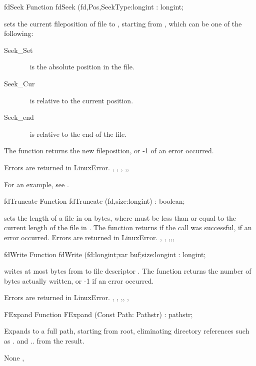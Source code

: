 \begin{function}{fdSeek}
\Declaration
Function fdSeek (fd,Pos,SeekType:longint : longint;

\Description
{} sets the current fileposition of file  to
, starting from , which can be one of the following:
\begin{description}
\item [Seek\_Set] \  is the absolute position in the file.
\item [Seek\_Cur] \  is relative to the current position.
\item [Seek\_end] \  is relative to the end of the file.
\end{description}
The function returns the new fileposition, or -1 of an error occurred.

\Errors
Errors are returned in LinuxError.
\SeeAlso
{}, , ,
,,
\end{function}
For an example, see .
\begin{function}{fdTruncate}
\Declaration
Function fdTruncate (fd,size:longint) : boolean;

\Description
{} sets the length of a file in  on 
bytes, where  must be less than or equal to the current length of
the file in .
The function returns  if the call was successful,  if
an error occurred.
\Errors
Errors are returned in LinuxError.
\SeeAlso
{}, , ,,,
\end{function}
\begin{function}{fdWrite}
\Declaration
Function fdWrite (fd:longint;var buf;size:longint : longint;

\Description
{} writes at most  bytes from  to
file descriptor .
The function returns the number of bytes actually written, or -1 if an error
occurred.

\Errors
Errors are returned in LinuxError.
\SeeAlso
{}, , ,,
, 
\end{function}
\begin{function}{FExpand}
\Declaration
Function FExpand (Const Path: Pathstr) : pathstr;

\Description
 Expands  to a full path, starting from root,
eliminating directory references such as . and .. from the result.

\Errors
None
\SeeAlso
{}, 
\end{function}
